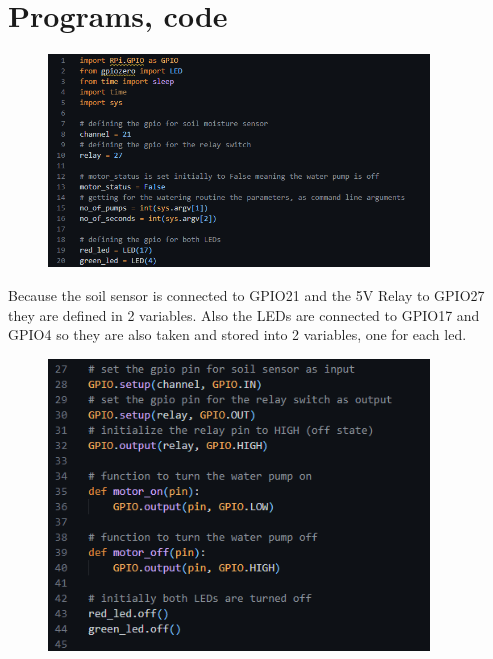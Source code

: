 \documentclass[12pt]{article}
\begin{document}
\newpage

\section{Programs, code}

\begin{figure}[ht]
    \centering
    \includegraphics[width=0.9\textwidth]{images/image5.png}
    \label{fig:pic19}
\end{figure} 

Because the soil sensor is connected to GPIO21 and the 5V Relay to GPIO27 they are defined in 2 variables. Also the LEDs are connected to GPIO17 and GPIO4 so they are also taken and stored into 2 variables, one for each led.\\

\begin{figure}[ht]
    \centering
    \includegraphics[width=0.9\textwidth]{images/image19.png}
    \label{fig:pic20}
\end{figure} 
\end{document}
